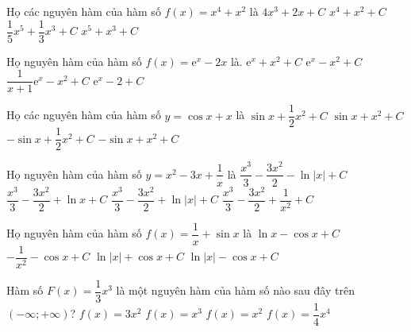 \begin{ex}
	Họ các nguyên hàm của hàm số $ f(x)=x^4+x^2$ là
	\choice
	{$ 4x^3+2x+C$}
	{$x^4+x^2+C$}
	{\True $\dfrac{1}{5}{x^5}+\dfrac{1}{3}{x^3}+C$}
	{$x^5+x^3+C$}
\end{ex}
\begin{ex}
	Họ nguyên hàm của hàm số $ f(x)=\mathrm{e}^x-2x$ là.
	\choice
	{$\mathrm{e}^x+x^2+C$}
	{\True $\mathrm{e}^x-x^2+C$}
	{$\dfrac{1}{x+1}{\mathrm{e}^x}-x^2+C$}
	{$\mathrm{e}^x-2+C$}
\end{ex}
\begin{ex}
	Họ các nguyên hàm của hàm số $y=\cos x+x$ là
	\choice
	{\True $\sin x+\dfrac{1}{2}{x^2}+C$}
	{$\sin x+x^2+C$}
	{$-\sin x+\dfrac{1}{2}{x^2}+C$}
	{$-\sin x+x^2+C$}
\end{ex}
\begin{ex}
	Họ nguyên hàm của hàm số $y=x^2-3x+\dfrac{1}{x}$ là
	\choice
	{$\dfrac{x^3}{3}-\dfrac{3x^2}{2}-\ln \left| x\right|+C$}
	{$\dfrac{x^3}{3}-\dfrac{3x^2}{2}+\ln x+C$}
	{\True $\dfrac{x^3}{3}-\dfrac{3x^2}{2}+\ln \left| x\right|+C$}
	{$\dfrac{x^3}{3}-\dfrac{3x^2}{2}+\dfrac{1}{x^2}+C$}
\end{ex}
\begin{ex}
	Họ nguyên hàm của hàm số $ f(x)=\dfrac{1}{x}+\sin x$ là
	\choice
	{$\ln x-\cos x+C$}
	{$-\dfrac{1}{x^2}-\cos x+C$}
	{$\ln \left| x\right|+\cos x+C$}
	{\True $\ln \left| x\right|-\cos x+C$}
\end{ex}
\begin{ex}
	Hàm số $ F(x)=\dfrac{1}{3}{x^3}$ là một nguyên hàm của hàm số nào sau đây trên $\left(-\infty ;+\infty\right)$?
	\choice
	{$ f(x)=3x^2$}
	{$ f(x)=x^3$}
	{\True $ f(x)=x^2$}
	{$ f(x)=\dfrac{1}{4}{x^4}$}
\end{ex}
